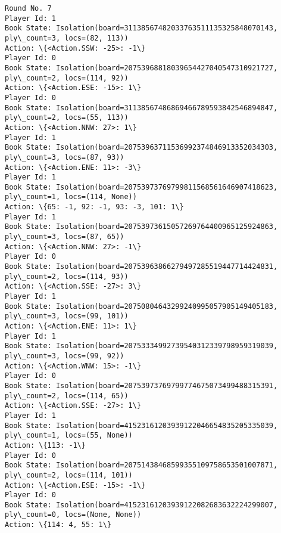 \documentclass[11pt]{article}
\begin{document}
\begin{Verbatim}[commandchars=\\\{\}]
Round No. 7
Player Id: 1
Book State: Isolation(board=31138567482033763511135325848070143, ply\_count=3, locs=(82, 113))
Action: \{<Action.SSW: -25>: -1\}
Player Id: 0
Book State: Isolation(board=20753968818039654427040547310921727, ply\_count=2, locs=(114, 92))
Action: \{<Action.ESE: -15>: 1\}
Player Id: 0
Book State: Isolation(board=31138567486869466789593842546894847, ply\_count=2, locs=(55, 113))
Action: \{<Action.NNW: 27>: 1\}
Player Id: 1
Book State: Isolation(board=20753963711536992374846913352034303, ply\_count=3, locs=(87, 93))
Action: \{<Action.ENE: 11>: -3\}
Player Id: 1
Book State: Isolation(board=20753973769799811568561646907418623, ply\_count=1, locs=(114, None))
Action: \{65: -1, 92: -1, 93: -3, 101: 1\}
Player Id: 1
Book State: Isolation(board=20753973615057269764400965125924863, ply\_count=3, locs=(87, 65))
Action: \{<Action.NNW: 27>: -1\}
Player Id: 0
Book State: Isolation(board=20753963866279497285519447714424831, ply\_count=2, locs=(114, 93))
Action: \{<Action.SSE: -27>: 3\}
Player Id: 1
Book State: Isolation(board=20750804643299240995057905149405183, ply\_count=3, locs=(99, 101))
Action: \{<Action.ENE: 11>: 1\}
Player Id: 1
Book State: Isolation(board=20753334992739540312339798959319039, ply\_count=3, locs=(99, 92))
Action: \{<Action.WNW: 15>: -1\}
Player Id: 0
Book State: Isolation(board=20753973769799774675073499488315391, ply\_count=2, locs=(114, 65))
Action: \{<Action.SSE: -27>: 1\}
Player Id: 1
Book State: Isolation(board=41523161203939122046654835205335039, ply\_count=1, locs=(55, None))
Action: \{113: -1\}
Player Id: 0
Book State: Isolation(board=20751438468599355109758653501007871, ply\_count=2, locs=(114, 101))
Action: \{<Action.ESE: -15>: -1\}
Player Id: 0
Book State: Isolation(board=41523161203939122082683632224299007, ply\_count=0, locs=(None, None))
Action: \{114: 4, 55: 1\}


\end{Verbatim}
\end{document}
